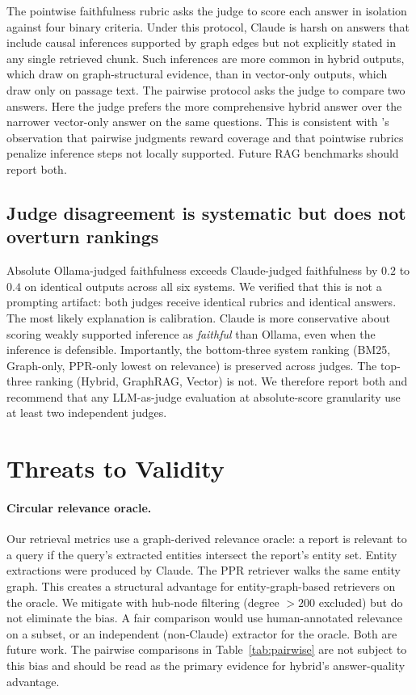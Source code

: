 \documentclass[10pt,a4paper]{article}
\begin{document}
The pointwise faithfulness rubric asks the judge to score each
answer in isolation against four binary criteria. Under this
protocol, Claude is harsh on answers that include causal inferences
supported by graph edges but not explicitly stated in any single
retrieved chunk. Such inferences are more common in hybrid outputs,
which draw on graph-structural evidence, than in vector-only
outputs, which draw only on passage text. The pairwise protocol asks
the judge to compare two answers. Here the judge prefers the more
comprehensive hybrid answer over the narrower vector-only answer on
the same questions. This is consistent with
\citet{zheng2024judgingllm}'s observation that pairwise judgments
reward coverage and that pointwise rubrics penalize inference steps
not locally supported. Future RAG benchmarks should report both.

\subsection{Judge disagreement is systematic but does not overturn rankings}

Absolute Ollama-judged faithfulness exceeds Claude-judged
faithfulness by $0.2$ to $0.4$ on identical outputs across all six
systems. We verified that this is not a prompting artifact: both
judges receive identical rubrics and identical answers. The most
likely explanation is calibration. Claude is more conservative about
scoring weakly supported inference as \emph{faithful} than Ollama,
even when the inference is defensible. Importantly, the bottom-three
system ranking (BM25, Graph-only, PPR-only lowest on relevance) is
preserved across judges. The top-three ranking (Hybrid, GraphRAG,
Vector) is not. We therefore report both and recommend that any
LLM-as-judge evaluation at absolute-score granularity use at least
two independent judges.

\section{Threats to Validity}
\label{sec:threats}

\paragraph{Circular relevance oracle.}
Our retrieval metrics use a graph-derived relevance oracle: a report
is relevant to a query if the query's extracted entities intersect
the report's entity set. Entity extractions were produced by Claude.
The PPR retriever walks the same entity graph. This creates a
structural advantage for entity-graph-based retrievers on the
oracle. We mitigate with hub-node filtering (degree $> 200$
excluded) but do not eliminate the bias. A fair comparison would
use human-annotated relevance on a subset, or an independent
(non-Claude) extractor for the oracle. Both are future work. The
pairwise comparisons in Table~\ref{tab:pairwise} are not subject to
this bias and should be read as the primary evidence for hybrid's
answer-quality advantage.
\end{document}

